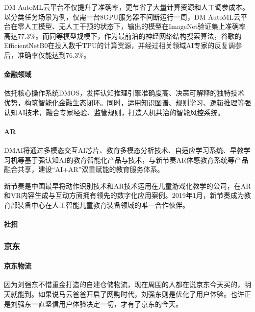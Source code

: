 \documentclass[letterpaper,10pt,english]{sphinxmanual}
\begin{document}
DM
AutoML云平台不仅提升了准确率，更节省了大量计算资源和人工调参成本。以分类任务场景为例，仅需一台8GPU服务器不间断运行一周，DM
AutoML云平台在零人工模型、无人工干预的状态下，输出的模型在ImageNet验证集上准确率高达77.3\%。而同等模型规模下，作为最前沿的神经网络结构搜索算法，谷歌的EfficientNetB0在投入数千TPU的计算资源，并经过相关领域AI专家的反复调参后，准确率仅能达到76.3\%。


\paragraph{金融领域}
\label{\detokenize{chapter_AI_company/dm-ai:id12}}
依托核心操作系统DMOS，发挥认知推理引擎准确度高、决策可解释的独特技术优势，构筑智能化金融生态闭环。同时，运用知识图谱、规则学习、逻辑推理等强认知AI技术，融合专家经验、监管规则，打造人机共治的智能风控系统。


\paragraph{AR}
\label{\detokenize{chapter_AI_company/dm-ai:ar}}
DMAI将通过多模态交互AI芯片、教育多模态分析技术、自适应学习系统、早教学习机等基于强认知AI的教育智能化产品与技术，与新节奏AR体感教育系统等产品融合共享，建设“AI+AR”双重赋能的教育服务体系。

新节奏是中国最早将动作识别技术和AR技术运用在儿童游戏化教学的公司，在AR和VR内容生成与互动方面拥有领先的数字化应用案例。2019年1月，新节奏成为教育部装备中心在人工智能儿童教育装备领域的唯一合作伙伴。


\paragraph{社招}
\label{\detokenize{chapter_AI_company/dm-ai:id13}}


\subsubsection{京东}
\label{\detokenize{chapter_AI_company/jd:id1}}\label{\detokenize{chapter_AI_company/jd::doc}}

\paragraph{京东物流}
\label{\detokenize{chapter_AI_company/jd:id2}}
因为刘强东不惜重金打造的自建仓储物流，现在周围的人都在说京东今天买的，明天就能到。如果说马云爸爸开启了网购时代，刘强东则是优化了用户体验。也许正是刘强东一直坚信用户体验决定一切，才有了京东的今天。%
\begin{footnote}[1018]\sphinxAtStartFootnote
{}
%
\end{footnote}
\end{document}

